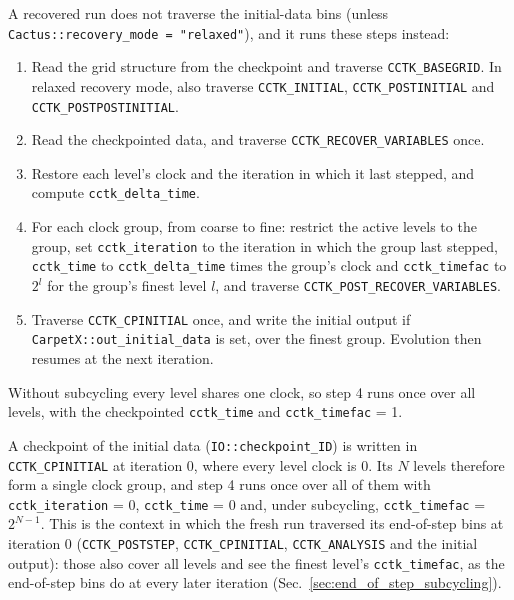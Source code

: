 A recovered run does not traverse the initial-data bins (unless \texttt{Cactus::recovery\_mode = "relaxed"}), and it runs these steps instead:
%
\begin{enumerate}
\item Read the grid structure from the checkpoint and traverse \texttt{CCTK\_BASEGRID}. In relaxed recovery mode, also traverse \texttt{CCTK\_INITIAL}, \texttt{CCTK\_POSTINITIAL} and \texttt{CCTK\_POSTPOSTINITIAL}.
\item Read the checkpointed data, and traverse \texttt{CCTK\_RECOVER\_VARIABLES} once.
\item Restore each level's clock and the iteration in which it last stepped, and compute \texttt{cctk\_delta\_time}.
\item For each clock group, from coarse to fine: restrict the active levels to the group, set \texttt{cctk\_iteration} to the iteration in which the group last stepped, \texttt{cctk\_time} to \texttt{cctk\_delta\_time} times the group's clock and \texttt{cctk\_timefac} to $2^l$ for the group's finest level $l$, and traverse \texttt{CCTK\_POST\_RECOVER\_VARIABLES}.
\item Traverse \texttt{CCTK\_CPINITIAL} once, and write the initial output if \texttt{CarpetX::out\_initial\_data} is set, over the finest group. Evolution then resumes at the next iteration.
\end{enumerate}
%
Without subcycling every level shares one clock, so step 4 runs once over all levels, with the checkpointed \texttt{cctk\_time} and \texttt{cctk\_timefac} = 1.

A checkpoint of the initial data (\texttt{IO::checkpoint\_ID}) is written in \texttt{CCTK\_CPINITIAL} at iteration 0, where every level clock is 0. Its $N$ levels therefore form a single clock group, and step 4 runs once over all of them with \texttt{cctk\_iteration} = 0, \texttt{cctk\_time} = 0 and, under subcycling, \texttt{cctk\_timefac} = $2^{N-1}$. This is the context in which the fresh run traversed its end-of-step bins at iteration 0 (\texttt{CCTK\_POSTSTEP}, \texttt{CCTK\_CPINITIAL}, \texttt{CCTK\_ANALYSIS} and the initial output): those also cover all levels and see the finest level's \texttt{cctk\_timefac}, as the end-of-step bins do at every later iteration (Sec.~\ref{sec:end_of_step_subcycling}).

